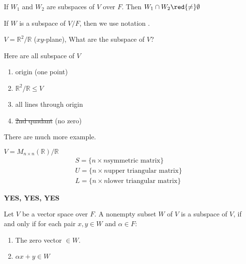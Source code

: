 \begin{remark}
    If $W_1$ and $W_2$ are subspaces of $V$ over $F$. Then $W_1 \cap W_2 \red{\neq} \emptyset$
\end{remark}

\begin{note}
If $W$ is a subspace of $V/F$, then we use notation .
\end{note}

\begin{exercise}
$V = \mathbb{R}^2/\mathbb{R}$ ($xy$-plane), What are the subspace of $V$?
\end{exercise}
\begin{answer}
    Here are all subspace of $V$
    \begin{enumerate}[label=(\roman*)]
        \item origin (one point)
        \item $\mathbb{R}^2/\mathbb{R} \leq V$
        \item all lines through origin
        \item \sout{2nd quadant} (no zero)
    \end{enumerate}
    There are much more example.
\end{answer}

\begin{exercise}
$V = M_{n\times n}(\mathbb{R})/\mathbb{R}$
\begin{align*}
    &S = \{n\times n \text{symmetric matrix}\} \\
    &U = \{n\times n \text{upper triangular matrix}\} \\
    &L = \{n\times n \text{lower triangular matrix}\}
\end{align*}
\end{exercise}
\begin{answer}
\textbf{YES, YES, YES}
\end{answer}

\begin{theorem}[\label{thm:2.1.1}]
    Let $V$ be a vector space over $F$. A nonempty subset $W$ of $V$ is a subspace of $V$, if and only if for each pair $x, y \in W$ and $\alpha \in F$:
    \begin{enumerate}[label=$\arabic*^\circ$]
        \item The zero vector $\in W$.
        \item $\alpha x + y \in W$
    \end{enumerate}
\end{theorem}


